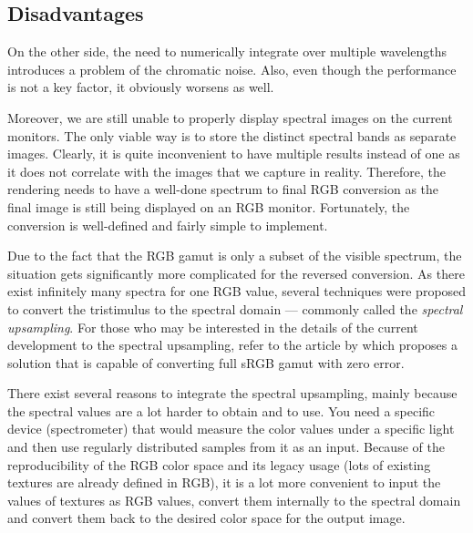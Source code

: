 \subsection{Disadvantages}

On the other side, the need to numerically integrate over multiple wavelengths introduces a problem of the chromatic noise. Also, even though the performance is not a key factor, it obviously worsens as well. 

Moreover, we are still unable to properly display spectral images on the current monitors. The only viable way is to store the distinct spectral bands as separate images. Clearly, it is quite inconvenient to have multiple results instead of one as it does not correlate with the images that we capture in reality. Therefore, the rendering needs to have a well-done spectrum to final RGB conversion as the final image is still being displayed on an RGB monitor. Fortunately, the conversion is well-defined and fairly simple to implement.

Due to the fact that the RGB gamut is only a subset of the visible spectrum, the situation gets significantly more complicated for the reversed conversion. As there exist infinitely many spectra for one RGB value, several techniques were proposed to convert the tristimulus to the spectral domain --- commonly called the \emph{spectral upsampling}. For those who may be interested in the details of the current development to the spectral upsampling, refer to the article by \citet{jakob2019low} which proposes a solution that is capable of converting full sRGB gamut with zero error. 

There exist several reasons to integrate the spectral upsampling, mainly because the spectral values are a lot harder to obtain and to use. You need a specific device (spectrometer) that would measure the color values under a specific light and then use regularly distributed samples from it as an input. Because of the reproducibility of the RGB color space and its legacy usage (lots of existing textures are already defined in RGB), it is a lot more convenient to input the values of textures as RGB values, convert them internally to the spectral domain and convert them back to the desired color space for the output image.


